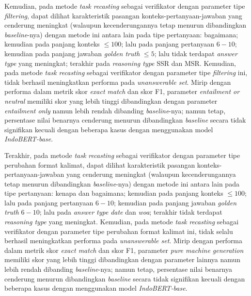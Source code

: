 \begin{enumerate}
 Kemudian, pada metode \emph{task recasting} sebagai verifikator dengan parameter tipe \emph{filtering}, dapat dilihat karakteristik pasangan konteks-pertanyaan-jawaban yang cenderung meningkat (walaupun kecenderungannya tetap menurun dibandingkan \emph{baseline}-nya) dengan metode ini antara lain pada tipe pertanyaan: bagaimana; kemudian pada panjang konteks $\leq100$; lalu pada panjang pertanyaan $6-10$; kemudian pada panjang jawaban \emph{golden truth} $\leq5$; lalu tidak terdapat \emph{answer type} yang meningkat; terakhir pada \emph{reasoning type} SSR dan MSR. Kemudian, pada metode \emph{task recasting} sebagai verifikator dengan parameter tipe \emph{filtering} ini, tidak berhasil meningkatkan performa pada \emph{unanswerable set}. Mirip dengan performa dalam metrik skor \emph{exact match} dan skor F1, parameter \emph{entailment or neutral} memiliki skor yang lebih tinggi dibandingkan dengan parameter \emph{entailment only} namun lebih rendah dibanding \emph{baseline}-nya; namun tetap, persentase nilai benarnya cenderung menurun dibandingkan \emph{baseline} secara tidak signifikan kecuali dengan beberapa kasus dengan menggunakan model \emph{IndoBERT-base}. 

 Terakhir, pada metode \emph{task recasting} sebagai verifikator dengan parameter tipe perubahan format kalimat, dapat dilihat karakteristik pasangan konteks-pertanyaan-jawaban yang cenderung meningkat (walaupun kecenderungannya tetap menurun dibandingkan \emph{baseline}-nya) dengan metode ini antara lain pada tipe pertanyaan: kenapa dan bagaimana; kemudian pada panjang konteks $\leq100$; lalu pada panjang pertanyaan $6-10$; kemudian pada panjang jawaban \emph{golden truth} $6-10$; lalu pada \emph{answer type} \emph{date} dan \emph{woa}; terakhir tidak terdapat \emph{reasoning type} yang meningkat. Kemudian, pada metode \emph{task recasting} sebagai verifikator dengan parameter tipe perubahan format kalimat ini, tidak selalu berhasil meningkatkan performa pada \emph{unanswerable set}. Mirip dengan performa dalam metrik skor \emph{exact match} dan skor F1, parameter \emph{pure machine generation} memiliki skor yang lebih tinggi dibandingkan dengan parameter lainnya namun lebih rendah dibanding \emph{baseline}-nya; namun tetap, persentase nilai benarnya cenderung menurun dibandingkan \emph{baseline} secara tidak signifikan kecuali dengan beberapa kasus dengan menggunakan model \emph{IndoBERT-base}. 

\end{enumerate}

